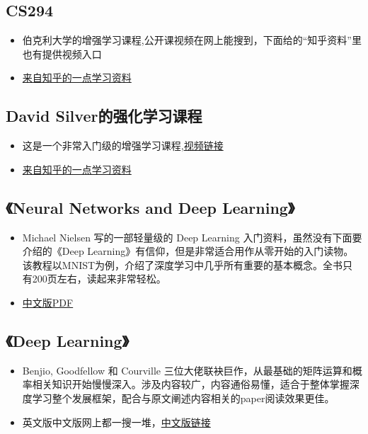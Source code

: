\documentclass{ctexart}
\begin{document}
\subsection{CS294}

\begin{itemize}
	\item 伯克利大学的增强学习课程,公开课视频在网上能搜到，下面给的“知乎资料”里也有提供视频入口
    \item \href{https://zhuanlan.zhihu.com/p/24721292}{来自知乎的一点学习资料} 
\end{itemize}

\subsection{David Silver的强化学习课程}

\begin{itemize}
	\item 这是一个非常入门级的增强学习课程,\href{http://techtalks.tv/talks/deep-reinforcement-learning/62360}{视频链接} 
    \item \href{https://zhuanlan.zhihu.com/reinforce}{来自知乎的一点学习资料} 
\end{itemize}

\subsection{《Neural Networks and Deep Learning》}
\begin{itemize}
    \item Michael Nielsen 写的一部轻量级的 Deep Learning 入门资料，虽然没有下面要介绍的《Deep Learning》有信仰，但是非常适合用作从零开始的入门读物。该教程以MNIST为例，介绍了深度学习中几乎所有重要的基本概念。全书只有200页左右，读起来非常轻松。
    \item \href{https://github.com/zhanggyb/nndl/releases}{中文版PDF}
    
\end{itemize}
\subsection{《Deep Learning》}

\begin{itemize}
	\item Benjio, Goodfellow 和 Courville 三位大佬联袂巨作，从最基础的矩阵运算和概率相关知识开始慢慢深入。涉及内容较广，内容通俗易懂，适合于整体掌握深度学习整个发展框架，配合与原文阐述内容相关的paper阅读效果更佳。
    \item 英文版中文版网上都一搜一堆，\href{https://github.com/exacity/deeplearningbook-chinese}{中文版链接}
\end{itemize}
\end{document}
